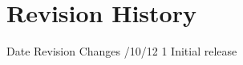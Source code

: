 \chapter[revision-history]{Revision History}

\startplacetable[location={here,none}]
\startxtable
\startxtablehead
\startxrow[head]
\startxcell
Date
\stopxcell
\startxcell[align=center]
​Revision
\stopxcell
\startxcell
Changes
\stopxcell
\stopxrow
\stopxtablehead
\startxtablebody
\startxrow[lastbody]
/10/12
\stopxcell
\startxcell[align=center]
​1
\stopxcell
\startxcell
Initial release
\stopxcell
\stopxrow
\stopxtablebody
\stopxtable
\stopplacetable